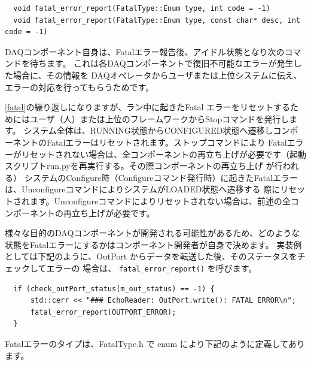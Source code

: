 \documentclass[a4j,10pt,dvips,onecolumn,oneside,final]{jarticle}%
\begin{document}
\begin{Verbatim}  
  void fatal_error_report(FatalType::Enum type, int code = -1)
  void fatal_error_report(FatalType::Enum type, const char* desc, int code = -1)
\end{Verbatim}

DAQコンポーネント自身は、Fatalエラー報告後、アイドル状態となり次のコマンドを待ちます。
これは各DAQコンポーネントで復旧不可能なエラーが発生した場合に、その情報を
DAQオペレータからユーザまたは上位システムに伝え、エラーの対応を行ってもらうためです。

\ref{fatal}の繰り返しになりますが、ラン中に起きたFatal エラーをリセットするためにはユーザ（人）または上位のフレームワークからStopコマンドを発行します。
システム全体は、RUNNING状態からCONFIGURED状態へ遷移しコンポーネントのFatalエラーはリセットされます。ストップコマンドにより
Fatalエラーがリセットされない場合は、全コンポーネントの再立ち上げが必要です（起動スクリプトrun.pyを再実行する。その際コンポーネントの再立ち上げ
が行われる）
システムのConfigure時（Configureコマンド発行時）に起きたFatalエラーは、UnconfigureコマンドによりシステムがLOADED状態へ遷移する
際にリセットされます。Unconfigureコマンドによりリセットされない場合は、前述の全コンポーネントの再立ち上げが必要です。

様々な目的のDAQコンポーネントが開発される可能性があるため、どのような状態をFatalエラーにするかはコンポーネント開発者が自身で決めます。
実装例としては下記のように、OutPort からデータを転送した後、そのステータスをチェックしてエラーの
場合は、 \verb|fatal_error_report()| を呼びます。
\begin{Verbatim}
  if (check_outPort_status(m_out_status) == -1) {
      std::cerr << "### EchoReader: OutPort.write(): FATAL ERROR\n";
      fatal_error_report(OUTPORT_ERROR);
  }
\end{Verbatim}

Fatalエラーのタイプは、FatalType.h で enum により下記のように定義してあります。
\end{document}

